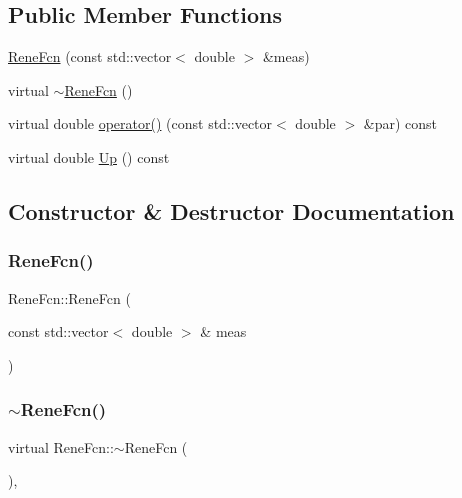 \subsection*{Public Member Functions}
\begin{DoxyCompactItemize}
\item 
\mbox{\hyperlink{classReneFcn_a6266b3646d9ddb228049b3584ca16758}{Rene\+Fcn}} (const std\+::vector$<$ double $>$ \&meas)
\item 
virtual \mbox{\hyperlink{classReneFcn_ab68c421be2378b7547452626cb7ec874}{$\sim$\+Rene\+Fcn}} ()
\item 
virtual double \mbox{\hyperlink{classReneFcn_a717a787ca09d586430bf5dc1d51b7ab1}{operator()}} (const std\+::vector$<$ double $>$ \&par) const
\item 
virtual double \mbox{\hyperlink{classReneFcn_a5e7e439a47c37d673d9366918c74239c}{Up}} () const
\end{DoxyCompactItemize}


\subsection{Constructor \& Destructor Documentation}
\mbox{\label{classReneFcn_a6266b3646d9ddb228049b3584ca16758}} 
\subsubsection{\texorpdfstring{ReneFcn()}{ReneFcn()}}
{\footnotesize\ttfamily Rene\+Fcn\+::\+Rene\+Fcn (\begin{DoxyParamCaption}\item[{const std\+::vector$<$ double $>$ \&}]{meas }\end{DoxyParamCaption})\hspace{0.3cm}{\ttfamily [inline]}}

\mbox{\label{classReneFcn_ab68c421be2378b7547452626cb7ec874}} 
\subsubsection{\texorpdfstring{$\sim$ReneFcn()}{~ReneFcn()}}
{\footnotesize\ttfamily virtual Rene\+Fcn\+::$\sim$\+Rene\+Fcn (\begin{DoxyParamCaption}{ }\end{DoxyParamCaption})\hspace{0.3cm}{\ttfamily [inline]}, {\ttfamily [virtual]}}



